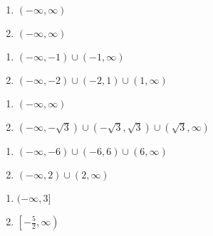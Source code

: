 \begin{multicols}{2}
\begin{enumerate}
\setcounter{enumi}{\value{HW}}


\item $(-\infty, \infty)$
\item  $(-\infty, \infty)$

\setcounter{HW}{\value{enumi}}
\end{enumerate}
\end{multicols}

\begin{multicols}{2}
\begin{enumerate}
\setcounter{enumi}{\value{HW}}

\item $(-\infty, -1) \cup (-1, \infty)$

\item  $(-\infty,-2) \cup (-2,1) \cup (1, \infty)$

\setcounter{HW}{\value{enumi}}
\end{enumerate}
\end{multicols}

\begin{multicols}{2}
\begin{enumerate}
\setcounter{enumi}{\value{HW}}

\item $(-\infty, \infty)$

\item  $(-\infty, -\sqrt{3}) \cup (-\sqrt{3}, \sqrt{3}) \cup (\sqrt{3}, \infty)$

\setcounter{HW}{\value{enumi}}
\end{enumerate}
\end{multicols}

\begin{multicols}{2}
\begin{enumerate}
\setcounter{enumi}{\value{HW}}


\item  $(-\infty, -6) \cup (-6,6) \cup (6, \infty)$

\item $(-\infty, 2) \cup (2, \infty)$

\setcounter{HW}{\value{enumi}}
\end{enumerate}
\end{multicols}

\begin{multicols}{2}
\begin{enumerate}
\setcounter{enumi}{\value{HW}}

\item  $(-\infty, 3]$

\item $\left[-\frac{5}{2}, \infty \right)$  

\setcounter{HW}{\value{enumi}}
\end{enumerate}
\end{multicols}

